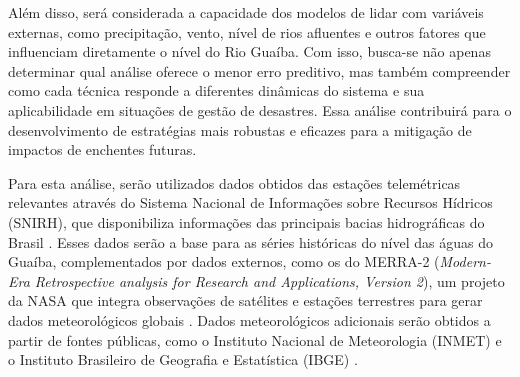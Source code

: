 Além disso, será considerada a capacidade dos modelos de lidar com variáveis externas, como precipitação, vento, nível
de rios afluentes e outros fatores que influenciam diretamente o nível do Rio Guaíba. Com isso, busca-se não apenas
determinar qual análise oferece o menor erro preditivo, mas também compreender como cada técnica responde a diferentes
dinâmicas do sistema e sua aplicabilidade em situações de gestão de desastres. Essa análise contribuirá para o
desenvolvimento de estratégias mais robustas e eficazes para a mitigação de impactos de enchentes futuras.

Para esta análise, serão utilizados dados  obtidos das estações telemétricas relevantes através do Sistema Nacional de
Informações sobre Recursos Hídricos (SNIRH), que disponibiliza informações das principais bacias hidrográficas do Brasil
\cite{snirh}. Esses dados serão a base para as séries históricas do nível das águas do Guaíba, complementados por dados
externos, como os do MERRA-2 (\textit{Modern-Era Retrospective analysis for Research and Applications, Version 2}), um
projeto da NASA que integra observações de satélites e estações terrestres para gerar dados meteorológicos globais
\cite{nasa}. Dados meteorológicos adicionais serão obtidos a partir de fontes públicas, como o Instituto Nacional de
Meteorologia (INMET) e o Instituto Brasileiro de Geografia e Estatística (IBGE) \cite{inmet}\cite{ibge}.